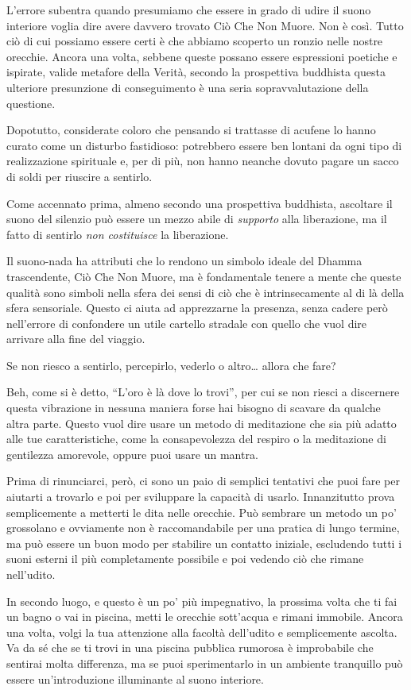 L'errore subentra quando presumiamo che essere in grado di udire il
suono interiore voglia dire avere davvero trovato Ciò Che Non Muore. Non
è così. Tutto ciò di cui possiamo essere certi è che abbiamo scoperto un
ronzio nelle nostre orecchie. Ancora una volta, sebbene queste possano
essere espressioni poetiche e ispirate, valide metafore della Verità,
secondo la prospettiva buddhista questa ulteriore presunzione di
conseguimento è una seria sopravvalutazione della questione.

Dopotutto, considerate coloro che pensando si trattasse di acufene lo
hanno curato come un disturbo fastidioso: potrebbero essere ben lontani
da ogni tipo di realizzazione spirituale e, per di più, non hanno
neanche dovuto pagare un sacco di soldi per riuscire a sentirlo.

Come accennato prima, almeno secondo una prospettiva buddhista,
ascoltare il suono del silenzio può essere un mezzo abile di
\emph{supporto} alla liberazione, ma il fatto di sentirlo \emph{non
costituisce} la liberazione.

Il suono-nada ha attributi che lo rendono un simbolo ideale del Dhamma
trascendente, Ciò Che Non Muore, ma è fondamentale tenere a mente che
queste qualità sono simboli nella sfera dei sensi di ciò che è
intrinsecamente al di là della sfera sensoriale. Questo ci aiuta ad
apprezzarne la presenza, senza cadere però nell'errore di confondere un
utile cartello stradale con quello che vuol dire arrivare alla fine del
viaggio.

\smallskip

Se non riesco a sentirlo, percepirlo, vederlo o altro\ldots{}
allora che fare?

Beh, come si è detto, ``L'oro è là dove lo trovi'', per cui se non
riesci a discernere questa vibrazione in nessuna maniera forse hai
bisogno di scavare da qualche altra parte. Questo vuol dire usare un
metodo di meditazione che sia più adatto alle tue caratteristiche, come
la consapevolezza del respiro o la meditazione di gentilezza amorevole,
oppure puoi usare un mantra.

Prima di rinunciarci, però, ci sono un paio di semplici tentativi che
puoi fare per aiutarti a trovarlo e poi per sviluppare la capacità di
usarlo. Innanzitutto prova semplicemente a metterti le dita nelle
orecchie. Può sembrare un metodo un po' grossolano e ovviamente non è
raccomandabile per una pratica di lungo termine, ma può essere un buon
modo per stabilire un contatto iniziale, escludendo tutti i suoni
esterni il più completamente possibile e poi vedendo ciò che rimane
nell'udito.

In secondo luogo, e questo è un po' più impegnativo, la prossima volta
che ti fai un bagno o vai in piscina, metti le orecchie sott'acqua e
rimani immobile. Ancora una volta, volgi la tua attenzione alla facoltà
dell'udito e semplicemente ascolta. Va da sé che se ti trovi in una
piscina pubblica rumorosa è improbabile che sentirai molta differenza,
ma se puoi sperimentarlo in un ambiente tranquillo può essere
un'introduzione illuminante al suono interiore.

